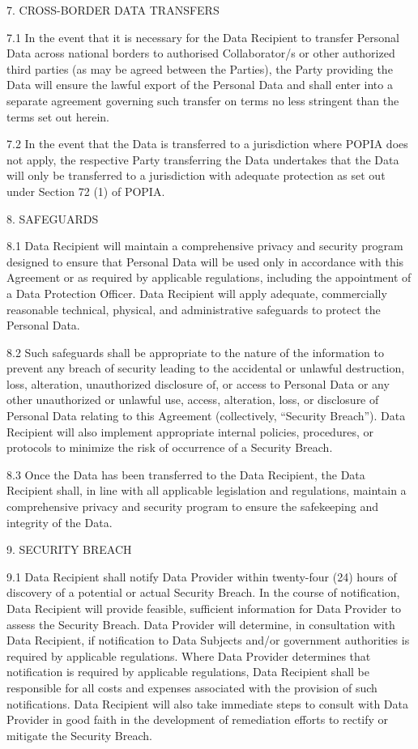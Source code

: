 \documentclass[12pt,letterpaper]{article}
\begin{document}
7.	CROSS-BORDER DATA TRANSFERS	

7.1	In the event that it is necessary for the Data Recipient to transfer Personal Data across national borders to authorised Collaborator/s or other authorized third parties (as may be agreed between the Parties), the Party providing the Data will ensure the lawful export of the Personal Data and shall enter into a separate agreement governing such transfer on terms no less stringent than the terms set out herein. 

7.2	In the event that the Data is transferred to a jurisdiction where POPIA does not apply, the respective Party transferring the Data undertakes that the Data will only be transferred to a jurisdiction with adequate protection as set out under Section 72 (1) of POPIA. 

8.	SAFEGUARDS	

8.1	Data Recipient will maintain a comprehensive privacy and security program designed to ensure that Personal Data will be used only in accordance with this Agreement or as required by applicable regulations, including the appointment of a Data Protection Officer.  Data Recipient will apply adequate, commercially reasonable technical, physical, and administrative safeguards to protect the Personal Data.  

8.2	Such safeguards shall be appropriate to the nature of the information to prevent any breach of security leading to the accidental or unlawful destruction, loss, alteration, unauthorized disclosure of, or access to Personal Data or any other unauthorized or unlawful use, access, alteration, loss, or disclosure of Personal Data relating to this Agreement (collectively, “Security Breach”).  Data Recipient will also implement appropriate internal policies, procedures, or protocols to minimize the risk of occurrence of a Security Breach.

8.3	Once the Data has been transferred to the Data Recipient, the Data Recipient shall, in line with all applicable legislation and regulations, maintain a comprehensive privacy and security program to ensure the safekeeping and integrity of the Data.

9.	SECURITY BREACH	

9.1	Data Recipient shall notify Data Provider within twenty-four (24) hours of discovery of a potential or actual Security Breach.  In the course of notification, Data Recipient will provide feasible, sufficient information for Data Provider to assess the Security Breach.  Data Provider will determine, in consultation with Data Recipient, if notification to Data Subjects and/or government authorities is required by applicable regulations.  Where Data Provider determines that notification is required by applicable regulations, Data Recipient shall be responsible for all costs and expenses associated with the provision of such notifications.  Data Recipient will also take immediate steps to consult with Data Provider in good faith in the development of remediation efforts to rectify or mitigate the Security Breach.  
\end{document}
